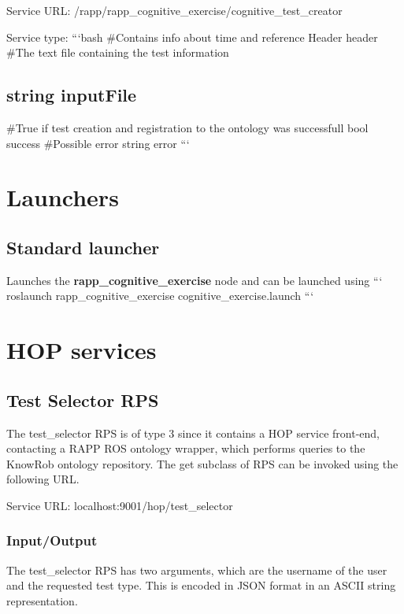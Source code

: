 Service U\-R\-L\-: {\ttfamily /rapp/rapp\-\_\-cognitive\-\_\-exercise/cognitive\-\_\-test\-\_\-creator}

Service type\-: ```bash \#\-Contains info about time and reference Header header \#\-The text file containing the test information \subsection*{string input\-File }

\#\-True if test creation and registration to the ontology was successfull bool success \#\-Possible error string error ```

\section*{Launchers}

\subsection*{Standard launcher}

Launches the {\bfseries rapp\-\_\-cognitive\-\_\-exercise} node and can be launched using ``` roslaunch rapp\-\_\-cognitive\-\_\-exercise cognitive\-\_\-exercise.\-launch ```

\section*{H\-O\-P services}

\subsection*{Test Selector R\-P\-S}

The test\-\_\-selector R\-P\-S is of type 3 since it contains a H\-O\-P service front-\/end, contacting a R\-A\-P\-P R\-O\-S ontology wrapper, which performs queries to the Know\-Rob ontology repository. The get subclass of R\-P\-S can be invoked using the following U\-R\-L.

Service U\-R\-L\-: {\ttfamily localhost\-:9001/hop/test\-\_\-selector}

\subsubsection*{Input/\-Output}

The test\-\_\-selector R\-P\-S has two arguments, which are the username of the user and the requested test type. This is encoded in J\-S\-O\-N format in an A\-S\-C\-I\-I string representation.

